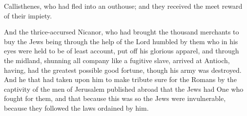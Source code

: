 {{} Callisthenes, who had fled into
 an outhouse; and
{} they received the meet reward of their impiety.
\par }{\PP {}And the thrice-accursed Nicanor, who had brought the thousand merchants to buy the Jews
{}
being through the help of the Lord humbled by them who in his eyes were held to be of least account, put off his glorious apparel, and
{} through the midland,
 shunning all company like a fugitive slave, arrived at Antioch,
 having,
{} had the greatest possible good fortune, though his army was destroyed.
And he that had taken upon him to make tribute sure for the Romans by the captivity of the men of Jerusalem published abroad that the Jews had One who fought for them, and that
 because this was so the Jews were invulnerable, because they followed the laws ordained by him.

}
